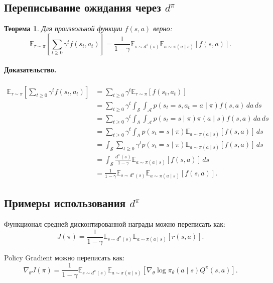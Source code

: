 \documentclass[12pt,a4paper]{article}
\newtheorem{theorem}{Теорема}
\begin{document}
\subsection{Переписывание ожидания через $d^\pi$}

\begin{theorem}
Для произвольной функции $f(s,a)$ верно:
\[
\mathbb E_{\tau\sim\pi}
\left[
\sum_{t\ge 0}
\gamma^t
f(s_t,a_t)
\right]
=
\frac{1}{1-\gamma}
\mathbb E_{s\sim d^\pi(s)}
\mathbb E_{a\sim\pi(a\mid s)}
\left[
f(s,a)
\right].
\]
\end{theorem}

\paragraph{Доказательство.}

\[
\begin{aligned}
\mathbb E_{\tau\sim\pi}
\left[
\sum_{t\ge 0}
\gamma^t
f(s_t,a_t)
\right]
&=
\sum_{t\ge 0}
\gamma^t
\mathbb E_{\tau\sim\pi}
\left[
f(s_t,a_t)
\right]
\\
&=
\sum_{t\ge 0}
\gamma^t
\int_{\mathcal S}
\int_{\mathcal A}
p(s_t=s,a_t=a\mid \pi)
f(s,a)
\,da\,ds
\\
&=
\sum_{t\ge 0}
\gamma^t
\int_{\mathcal S}
\int_{\mathcal A}
p(s_t=s\mid \pi)
\pi(a\mid s)
f(s,a)
\,da\,ds
\\
&=
\sum_{t\ge 0}
\gamma^t
\int_{\mathcal S}
p(s_t=s\mid \pi)
\mathbb E_{a\sim\pi(a\mid s)}
\left[
f(s,a)
\right]
\,ds
\\
&=
\int_{\mathcal S}
\sum_{t\ge 0}
\gamma^t
p(s_t=s\mid \pi)
\mathbb E_{a\sim\pi(a\mid s)}
\left[
f(s,a)
\right]
\,ds
\\
&=
\int_{\mathcal S}
\frac{d^\pi(s)}{1-\gamma}
\mathbb E_{a\sim\pi(a\mid s)}
\left[
f(s,a)
\right]
\,ds
\\
&=
\frac{1}{1-\gamma}
\mathbb E_{s\sim d^\pi(s)}
\mathbb E_{a\sim\pi(a\mid s)}
\left[
f(s,a)
\right].
\end{aligned}
\]

\subsection{Примеры использования $d^\pi$}

Функционал средней дисконтированной награды можно переписать как:
\[
J(\pi)
=
\frac{1}{1-\gamma}
\mathbb E_{s\sim d^\pi(s)}
\mathbb E_{a\sim\pi(a\mid s)}
\left[
r(s,a)
\right].
\]

Policy Gradient можно переписать как:
\[
\nabla_\theta J(\pi)
=
\frac{1}{1-\gamma}
\mathbb E_{s\sim d^\pi(s)}
\mathbb E_{a\sim\pi(a\mid s)}
\left[
\nabla_\theta
\log \pi_\theta(a\mid s)
Q^\pi(s,a)
\right].
\]
\end{document}
